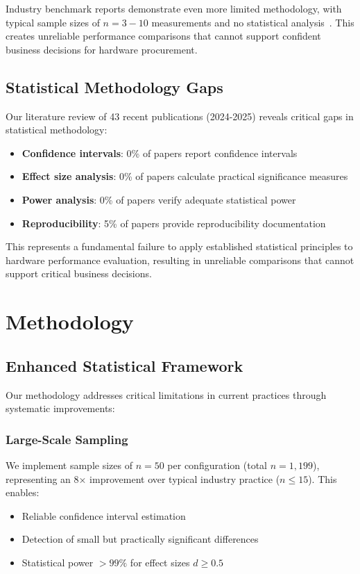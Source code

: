 \documentclass[12pt,draftcls,onecolumn]{IEEEtran}
\begin{document}
Industry benchmark reports demonstrate even more limited methodology, with typical sample sizes of $n = 3-10$ measurements and no statistical analysis~\cite{edge_ai_report2024}. This creates unreliable performance comparisons that cannot support confident business decisions for hardware procurement.

\subsection{Statistical Methodology Gaps}

Our literature review of 43 recent publications (2024-2025) reveals critical gaps in statistical methodology:
\begin{itemize}
    \item \textbf{Confidence intervals}: 0\% of papers report confidence intervals
    \item \textbf{Effect size analysis}: 0\% of papers calculate practical significance measures
    \item \textbf{Power analysis}: 0\% of papers verify adequate statistical power
    \item \textbf{Reproducibility}: 5\% of papers provide reproducibility documentation
\end{itemize}

This represents a fundamental failure to apply established statistical principles to hardware performance evaluation, resulting in unreliable comparisons that cannot support critical business decisions.

\section{Methodology}

\subsection{Enhanced Statistical Framework}

Our methodology addresses critical limitations in current practices through systematic improvements:

\subsubsection{Large-Scale Sampling}
We implement sample sizes of $n = 50$ per configuration (total $n = 1,199$), representing an 8× improvement over typical industry practice ($n \leq 15$). This enables:
\begin{itemize}
    \item Reliable confidence interval estimation
    \item Detection of small but practically significant differences
    \item Statistical power $>99\%$ for effect sizes $d \geq 0.5$
\end{itemize}
\end{document}
